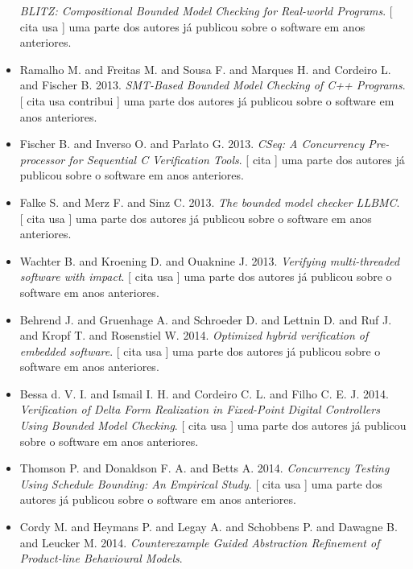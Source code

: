 \begin{itemize}
        \textit{ BLITZ: Compositional Bounded Model Checking for Real-world Programs}.
      [
          cita
          usa
      ]
uma parte dos autores já publicou sobre o software em anos anteriores.
\item Ramalho M. and Freitas M. and Sousa F. and Marques H. and Cordeiro L. and Fischer B.
      2013.
        \textit{ SMT-Based Bounded Model Checking of C++ Programs}.
      [
          cita
          usa
          contribui
      ]
uma parte dos autores já publicou sobre o software em anos anteriores.
\item Fischer B. and Inverso O. and Parlato G.
      2013.
        \textit{ CSeq: A Concurrency Pre-processor for Sequential C Verification Tools}.
      [
          cita
      ]
uma parte dos autores já publicou sobre o software em anos anteriores.
\item Falke S. and Merz F. and Sinz C.
      2013.
        \textit{ The bounded model checker LLBMC}.
      [
          cita
          usa
      ]
uma parte dos autores já publicou sobre o software em anos anteriores.
\item Wachter B. and Kroening D. and Ouaknine J.
      2013.
        \textit{ Verifying multi-threaded software with impact}.
      [
          cita
          usa
      ]
uma parte dos autores já publicou sobre o software em anos anteriores.
\item Behrend J. and Gruenhage A. and Schroeder D. and Lettnin D. and Ruf J. and Kropf T. and Rosenstiel W.
      2014.
        \textit{ Optimized hybrid verification of embedded software}.
      [
          cita
          usa
      ]
uma parte dos autores já publicou sobre o software em anos anteriores.
\item Bessa d. V. I. and Ismail I. H. and Cordeiro C. L. and Filho C. E. J.
      2014.
        \textit{ Verification of Delta Form Realization in Fixed-Point Digital Controllers Using Bounded Model Checking}.
      [
          cita
          usa
      ]
uma parte dos autores já publicou sobre o software em anos anteriores.
\item Thomson P. and Donaldson F. A. and Betts A.
      2014.
        \textit{ Concurrency Testing Using Schedule Bounding: An Empirical Study}.
      [
          cita
          usa
      ]
uma parte dos autores já publicou sobre o software em anos anteriores.
\item Cordy M. and Heymans P. and Legay A. and Schobbens P. and Dawagne B. and Leucker M.
      2014.
        \textit{ Counterexample Guided Abstraction Refinement of Product-line Behavioural Models}.

\end{itemize}
